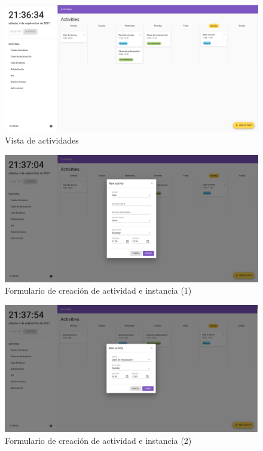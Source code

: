 \documentclass[10pt, a4paper]{aqademic}
\begin{document}
\begin{figure}[hbt!]
	\centering
	\includegraphics[scale=0.25]{img/demo-actividades-1.png}
	\caption{Vista de actividades}
\end{figure}

\begin{figure}[hbt!]
	\centering
	\includegraphics[scale=0.25]{img/demo-form-actividades-1.png}
	\caption{Formulario de creación de actividad e instancia (1)}
\end{figure}

\begin{figure}[hbt!]
	\centering
	\includegraphics[scale=0.25]{img/demo-formact-2.png}
	\caption{Formulario de creación de actividad e instancia (2)}
\end{figure}
\end{document}
